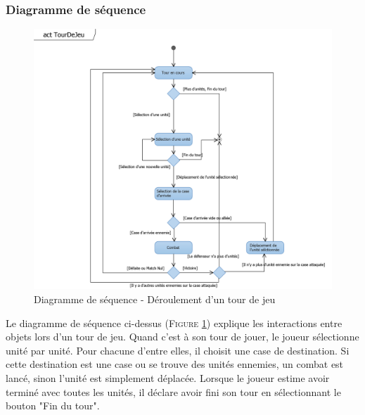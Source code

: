 \documentclass[a4paper,11pt]{article}
\begin{document}
		\subsubsection{Diagramme de séquence}
			\begin{figure}[ht!]
				\includegraphics{Diagrammes/Tour/actTourDeJeu.png}
				\caption{Diagramme de séquence - Déroulement d'un tour de jeu}
				\label{fig:seqtour}
				\end{figure}
			\vspace*{1cm}
			Le diagramme de séquence ci-dessus (\textsc{Figure \ref{fig:seqtour}}) explique les interactions entre objets lors d'un tour de jeu. Quand c'est à son tour de jouer, le joueur sélectionne unité par unité. Pour chacune d'entre elles, il choisit une case de destination. Si cette destination est une case ou se trouve des unités ennemies, un combat est lancé, sinon l'unité est simplement déplacée. Lorsque le joueur estime avoir terminé avec toutes les unités, il déclare avoir fini son tour en sélectionnant le bouton "Fin du tour".
			\newpage
\end{document}
